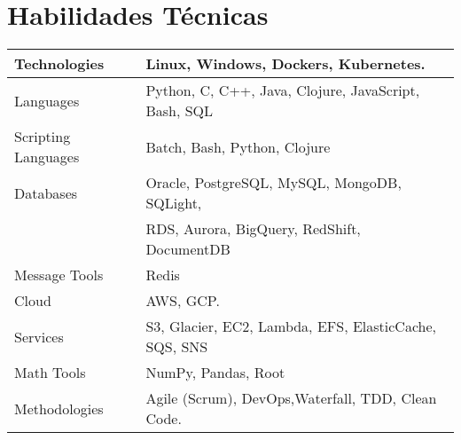 \section{Habilidades Técnicas}

\begin{center}
  \begin{tabular}{|| l | l ||}
      \hline
      Technologies & Linux, Windows, Dockers, Kubernetes. \\
      \hline
      Languages & Python, C, C++, Java, Clojure, JavaScript, Bash, SQL \\
    \hline
      Scripting Languages & Batch, Bash, Python, Clojure \\
    \hline
      Databases & Oracle, PostgreSQL, MySQL, MongoDB, SQLight, \\ & RDS, Aurora, BigQuery, RedShift, DocumentDB \\
    \hline
      Message Tools & Redis  \\
    \hline
      Cloud & AWS, GCP.  \\
    \hline
      Services & S3, Glacier, EC2, Lambda, EFS, ElasticCache, SQS, SNS \\
    \hline
      Math Tools & NumPy, Pandas, Root \\
    \hline
      Methodologies & Agile (Scrum), DevOps,Waterfall, TDD, Clean Code. \\
    \hline
  \end{tabular}
\end{center}

